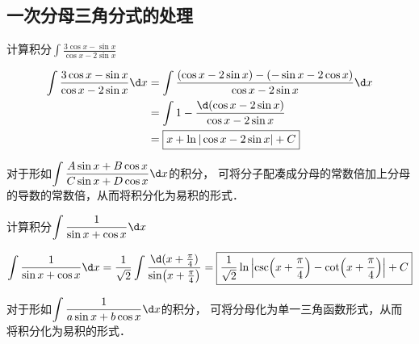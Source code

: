 \documentclass[12pt, a4paper, oneside, UTF8]{ctexbook}
\begin{document}
\subsection{一次分母三角分式的处理}
\begin{example}
    计算积分$\displaystyle \int \frac{3\cos x-\sin x}{\cos x-2\sin x}$
\end{example}
\begin{solution}
    \begin{align*}
        \int \dfrac{3\cos x - \sin x}{\cos x - 2\sin x} \d x
        &= \int \dfrac{(\cos x -2\sin x)-(-\sin x-2\cos x)}{\cos x - 2\sin x} \d x\\
        &= \int 1 - \dfrac{\d (\cos x-2\sin x)}{\cos x - 2\sin x}\\
        &= \boxed{x + \ln |\cos x - 2\sin x| + C}
    \end{align*}
\end{solution}
\begin{myRemark}
    对于形如$\displaystyle \int \dfrac{A\sin x + B\cos x}{C\sin x + D\cos x} \d x$的积分，
    可将分子配凑成分母的常数倍加上分母的导数的常数倍，从而将积分化为易积的形式．
\end{myRemark}
\begin{example}
    计算积分$\displaystyle \int \dfrac{1}{\sin x+\cos x} \d x$
\end{example}
\begin{solution}
    $\displaystyle\int \dfrac{1}{\sin x+\cos x} \d x
    =\dfrac{1}{\sqrt{2}}\int \frac{\d (x + \frac{\pi}{4})}{\sin (x + \frac{\pi}{4})}
    =\boxed{\dfrac{1}{\sqrt{2}} \ln \left| \csc (x + \frac{\pi}{4}) - \cot (x + \frac{\pi}{4}) \right| + C}$
\end{solution}
\begin{myRemark}
    对于形如$\displaystyle \int \dfrac{1}{a\sin x + b\cos x} \d x$的积分，
    可将分母化为单一三角函数形式，从而将积分化为易积的形式．
\end{myRemark}
\end{document}
